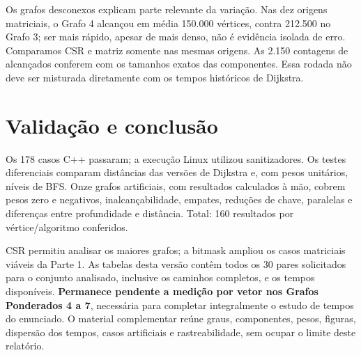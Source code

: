\documentclass[a4paper,11pt]{article}
\begin{document}
Os grafos desconexos explicam parte relevante da variação. Nas dez origens matriciais, o Grafo 4 alcançou em média 150.000 vértices, contra 212.500 no Grafo 3; ser mais rápido, apesar de mais denso, não é evidência isolada de erro. Comparamos CSR e matriz somente nas mesmas origens. As 2.150 contagens de alcançados conferem com os tamanhos exatos das componentes. Essa rodada não deve ser misturada diretamente com os tempos históricos de Dijkstra.
\section{Validação e conclusão}
Os 178 casos C++ passaram; a execução Linux utilizou sanitizadores. Os testes diferenciais comparam distâncias das versões de Dijkstra e, com pesos unitários, níveis de BFS. Onze grafos artificiais, com resultados calculados à mão, cobrem pesos zero e negativos, inalcançabilidade, empates, reduções de chave, paralelas e diferenças entre profundidade e distância. Total: 160 resultados por vértice/algoritmo conferidos.

CSR permitiu analisar os maiores grafos; a bitmask ampliou os casos matriciais viáveis da Parte 1. As tabelas desta versão contêm todos os 30 pares solicitados para o conjunto analisado, inclusive os caminhos completos, e os tempos disponíveis. \textbf{Permanece pendente a medição por vetor nos Grafos Ponderados 4 a 7}, necessária para completar integralmente o estudo de tempos do enunciado. O material complementar reúne graus, componentes, pesos, figuras, dispersão dos tempos, casos artificiais e rastreabilidade, sem ocupar o limite deste relatório.
\end{document}
